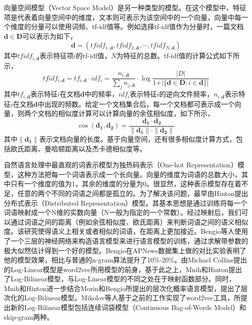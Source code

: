 向量空间模型（Vector Space Model）是另一种类型的模型。在这个模型中，特征项是代表着向量空间中的维度，文本则可表示为该空间中的一个向量，向量中每一个维度的分量可以使用词频、tf-idf值等。例如选择tf-idf值作为分量时，一篇文档$\mathbf{d} \in \mathbf{D}$可以表示为如下，
\begin{equation}
\label{eq:documentVec}
	\mathbf{d} = \left({tfidf}_{1,\mathbf{d}}, {tfidf}_{2,\mathbf{d}}, \cdots, {tfidf}_{N,\mathbf{d}}\right)
\end{equation}
其中${tfidf}_{i,\mathbf{d}}$表示特征项$i$的tf-idf值，$N$为特征的总数。tf-idf值的计算公式如下所示，
\begin{equation}
\label{eq:tfidfFormula}
	{tfidf}_{i,\mathbf{d}} = {tf}_{i,\mathbf{d}} \cdot {idf}_i = \frac{n_{i,\mathbf{d}}}{\sum_j n_{j,\mathbf{d}}} \cdot \log{\frac{|D|}{1 + \vert \{\mathbf{d} \in \mathbf{D} : i \in \mathbf{d}\}\vert}} 
\end{equation}
其中${tf}_{i,\mathbf{d}}$表示特征$i$在文档$\mathbf{d}$中的频率，${idf}_i$表示特征$i$的逆向文件频率，$n_{i,\mathbf{d}}$表示特征$i$在文档$\mathbf{d}$中出现的频数。给定一个文档集合后，每一个文档都可表示成一个向量，则两个文档的相似度计算可以计算向量的余弦相似度，如下所示，
\begin{equation}
\label{eq:cosSim}
	\cos \left( \mathbf{d_1}, \mathbf{d_2} \right) = \frac{\mathbf{d_1} \cdot \mathbf{d_2}}{\| \mathbf{d_1} \| \cdot \| \mathbf{d_2} \|}
\end{equation}
其中$\| \mathbf{d_1} \|$表示文档向量的长度。基于向量空间，还有很多相似度计算方式，包括欧氏距离、曼哈顿距离以及杰卡德相似度等。

自然语言处理中最直观的词表示模型为独热码表示（One-hot Representation）模型，这种方法把每一个词语表示成一个长向量。向量的维度为词语的总数大小，其中只有一个维度的值为1，其余的维度的分量为0。很显然，这种表示模型存在着不足，任意的两个不同的词语之间都是孤立的。为了解决该问题，最早由Hinton提出分布式表示（Distributed Representation）模型。其基本思想是通过训练将每一个词语映射成一个N维的实数向量（N一般为指定的一个常数）。经过映射后，我们可以通过词语之间的距离（例如余弦相似度、欧氏距离）来判断词语之间的语义相似度。该研究使得语义上相关或者相似的词语，在距离上更加接近。Bengio等人使用了一个三层的神经网络来构造语言模型来进行语言模型的训练，通过求解带参数的极大似然估计得到一个好的模型。Bengio在APNews数据集上做的对比实验表明了他的模型效果，相比与普通的n-gram算法提升了10\%-20\%。由Michael Collins提出的Log-Linear模型是word2vec所用模型的前身，基于此之上，Mnih和Hinton提出了Log-Bilinear模型，与Log-Linear模型的不同之处在于映射函数部分。同时，Mnih和Hinton进一步结合Morin和Bengio所提出的层次化概率语言模型，提出了层次化的Log-Bilinear模型。Mikolov等人基于之前的工作实现了word2vec工具，所提出新的Log-Bilinear模型包括连续词袋模型（Continuous	Bag-of-Words	Model）和skip-gram两种。

